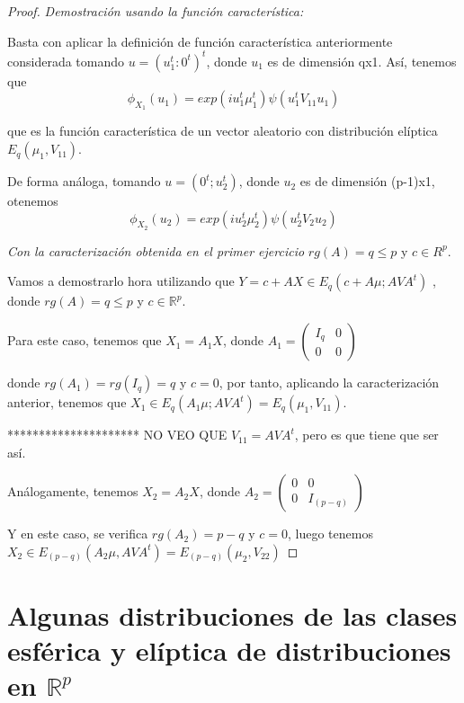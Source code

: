 \documentclass{article}
\theoremstyle{theorem-style}  %
\theoremstyle{definition}
\theoremstyle{example-style}
\begin{document}
		\begin{proof}
			
			\textit{Demostración usando la función característica: } 
			
			Basta con aplicar la definición de función característica anteriormente considerada tomando $u = (u_1^t: 0^t)^t$, donde $u_1$ es de dimensión qx1. Así, tenemos que
			\[
				\phi_{X_1}(u_1) = exp(i u_1^t \mu_1^t) \psi(u_1^t V_{11} u_1)
			\]
			
			que es la función característica de un vector aleatorio con distribución elíptica $E_q(\mu_1, V_{11})$.
			
			De forma análoga, tomando $u = (0^t; u_2^t)$, donde $u_2$ es de dimensión (p-1)x1, otenemos
			\[
							\phi_{X_2}(u_2) = exp(i u_2^t \mu_2^t) \psi(u_2^t V_{2} u_2)
			\]
			
			
			\textit{Con la caracterización obtenida en el primer ejercicio}
			$rg(A) = q \leq p$ y $c \in R^p$.
			

		Vamos a demostrarlo hora utilizando que $Y = c + AX \in E_q(c + A \mu; A V A^t)$ , donde  $rg(A) = q \leq p$ y $c \in \mathbb{R}^p$.
		
		Para este caso, tenemos que $X_1 = A_1 X$, donde $A_1 = \left( \begin{array}{cc}
		I_q & 0 \\ 0 & 0
		\end{array}\right)$

	
	  donde $rg(A_1) = rg(I_q) = q$ y $c = 0$, por tanto, aplicando la caracterización anterior, tenemos que $X_1 \in E_q(A_1 \mu; A V A^t) = E_q(\mu_1, V_{11})$.
	  
	  ********************* NO VEO QUE $V_{11} = A V A^t$, pero es que tiene que ser así.
	  
	  Análogamente, tenemos $X_2 = A_2 X$, donde $A_2 = \left( \begin{array}{cc}
	  0 & 0 \\ 0 & I_{(p-q)}
	  \end{array}\right)$
	  
	  Y en este caso, se verifica $rg(A_2) = p-q$ y $c = 0$, luego tenemos $X_2 \in E_{(p-q)}(A_2 \mu, A V A^t) = E_{(p-q)}(\mu_2, V_{22})$
	
	\end{proof}
	\section{Algunas distribuciones de las clases esférica y elíptica de distribuciones en $\mathbb{R}^p$ }
	
\end{document}
